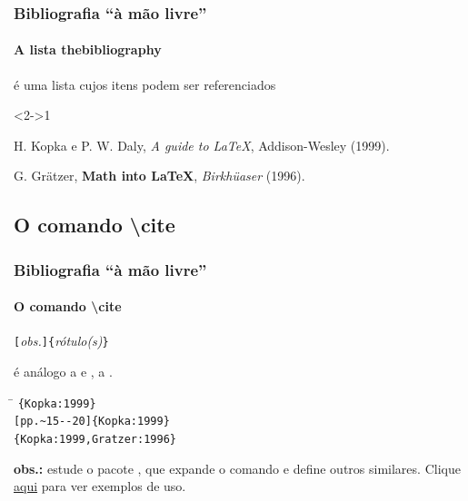 \documentclass[handout,10pt]{beamer}
\begin{document}
\begin{frame}[fragile]\small	
	\frametitle{Bibliografia ``à mão livre''}	
	\framesubtitle{A lista thebibliography}
		
	\begin{block}{}
		\centering
		 é uma lista cujos itens podem ser referenciados
	\end{block}\vfill
	
	\begin{atividade}<2->{1}
	
		\begin{LaTeXcode}
			\begin{thebibliography}{-}
			
			    H. Kopka e P. W. Daly,      %
			    \textsl{A guide to \LaTeX}, %
			    Addison-Wesley (1999).      %
			  
			    G. Grätzer, \textbf{Math into \LaTeX},
			    \textit{Birkhüaser} (1996).
			  
			\end{thebibliography}
		\end{LaTeXcode}
	\end{atividade}			
\end{frame}
\subsection{O comando {\ttfamily\textbackslash cite}}
	
\begin{frame}[fragile]
	\frametitle{Bibliografia ``à mão livre''}	
	\framesubtitle{O comando {\ttfamily\textbackslash cite}}	
	
	\begin{block}{}
		\centering
		\verb|[|\textit{obs.}\verb|]{|\textit{rótulo(s)}\verb|}|		
	\end{block}
	
	\begin{flushright}
		\footnotesize
		 é análogo a  e , a .
	\end{flushright}\vfill	
	
	\begin{tabbing}
		\hspace{0.6\textwidth}\=\kill
		\verb|{Kopka:1999}|\>\cite{Kopka:1999}\\
		\verb|[pp.~15--20]{Kopka:1999}|\>\cite[pp.~15--20]{Kopka:1999}\\
		\verb|{Kopka:1999,Gratzer:1996}|\>\cite{Kopka:1999,Gratzer:1996}
	\end{tabbing}\vfill
			
	\footnotesize
	\textbf{obs.:} estude o pacote , que expande o comando 
	 e define outros similares. Clique
	\href{http://merkel.zoneo.net/Latex/natbib.php}{aqui} para ver exemplos de
	uso.

\end{frame}
\end{document}
